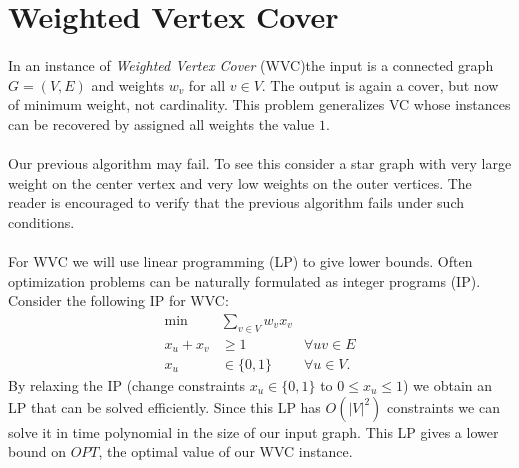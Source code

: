\documentclass[letterpaper,12pt,oneside,onecolumn]{article}
\begin{document}
\section{Weighted Vertex Cover}
\paragraph{}
In an instance of {\it Weighted Vertex Cover} (WVC)the input is a connected graph $G = (V,E)$ and weights $w_v$ for all $v \in V$. The output is again a cover, but now of minimum weight, not cardinality. This problem generalizes VC whose instances can be recovered by assigned all weights the value $1$.
\paragraph{}
Our previous algorithm may fail. To see this consider a star graph with very large weight on the center vertex and very low weights on the outer vertices. The reader is encouraged to verify that the previous algorithm fails under such conditions. 
\paragraph{}
For WVC we will use linear programming (LP) to give lower bounds. Often optimization problems can be naturally formulated as integer programs (IP). Consider the following IP for WVC:
\begin{align*}
\min &\sum_{v \in V} w_v x_v \\
x_u + x_v &\geq 1 &\forall uv \in E \\
x_u& \in \{0,1\} &\forall u \in V.
\end{align*}
By relaxing the IP (change constraints $x_u \in \{0,1\}$ to $0 \leq x_u \leq 1$) we obtain an LP that can be solved efficiently. Since this LP has $O(|V|^2)$ constraints we can solve it in time polynomial in the size of our input graph. This LP gives a lower bound on $OPT$, the optimal value of our WVC instance.
\end{document}
